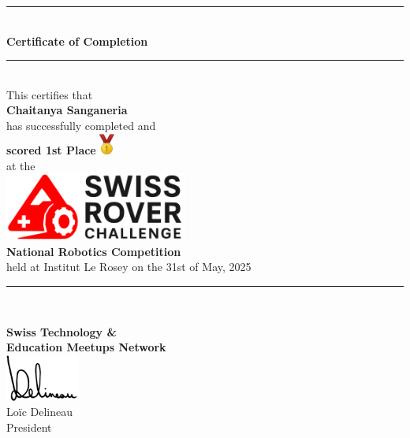 \documentclass[10pt]{article}
\begin{document}
\begin{center}
	\rule{10cm}{0.4pt} \\
	\vspace{1cm}
	{\LARGE \bfseries Certificate of Completion} \\
	\vspace{0.5cm}
	\rule{10cm}{0.4pt} \\
	\vspace{1.5cm}
	{\large This certifies that} \\
	\vspace{1cm}
	{\Huge \bfseries Chaitanya Sanganeria} \\
	\vspace{1cm}
	{\large has successfully completed and} \\
	\vspace{0.8cm}
	{\LARGE \bfseries scored 1st Place}
	\includegraphics[width=0.5cm]{gold.png} \\
	\vspace{1cm}
	{\large at the} \\
	\vspace{1cm}
	\href{https://swissroverchallenge.com}{\includegraphics[width=6cm]{src.png}} \\
	\vspace{1cm}
	{\LARGE \bfseries National Robotics Competition} \\
	\vspace{1cm}
	{\large held at Institut Le Rosey on the 31st of May, 2025} \\
	\vspace{1cm}
	\rule{10cm}{0.4pt} \\
\end{center}

\begin{flushright}
\end{flushright}

\vfill

\begin{center}
	\textbf{Swiss Technology \&} \\
	\textbf{Education Meetups Network} \\
	\vspace{0.3cm}
	\includegraphics[width=2.4cm]{signature-tight.png} \\
	Loïc Delineau \\
	President \\
\end{center}
\end{document}
